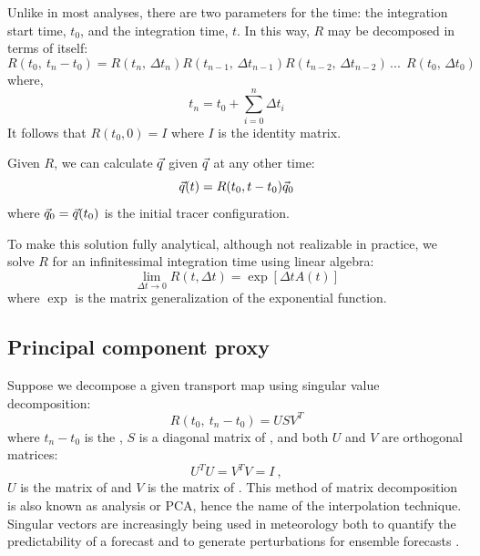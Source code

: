 Unlike in most analyses, there are two parameters for the time:
the integration start time, $t_0$, and the integration time, $t$.
In this way, $R$ may be decomposed in terms of itself:
\begin{equation}
	R(t_0,~t_n-t_0) = R(t_n, \, \Delta t_n) R(t_{n-1},\,\Delta t_{n-1}) R(t_{n-2},\,\Delta t_{n-2}) \, ...~~ 
	R(t_0,\,\Delta t_0)
\label{matrix_soln_decomposition}
\end{equation}
where,
\begin{equation}
t_n=t_0+\sum_{i=0}^{n} \Delta t_i
\end{equation}
It follows that $R(t_0, 0)=I$ where $I$ is the identity matrix.

Given $R$, 
we can calculate $\vec q$ given $\vec q$ at any other time:
\begin{equation}
	\vec q(t) = R(t_0, t-t_0) \vec q_0
	\label{tracer_integration}
\end{equation}
where $\vec q_0 = \vec q(t_0)$ is the initial tracer configuration.

To make this solution fully analytical, although not realizable in practice,
we solve $R$ for an infinitessimal integration time using linear algebra:
\begin{equation}
	\lim_{\Delta t \rightarrow 0} R(t, \Delta t) = \exp \left [ \Delta t A(t) \right ]
\end{equation}
where $\exp$ is the matrix generalization of the exponential function.

\subsection{Principal component proxy}

Suppose we decompose a given transport map using singular value decomposition:
\begin{equation}
	R(t_0, ~ t_n - t_0) = U S V^T
	\label{SVD}
\end{equation}
where 
$t_n - t_0$ is the ,
$S$ is a diagonal matrix of ,
and both $U$ and $V$ are orthogonal matrices:
\begin{equation}
	U^T U = V^T V = I~,
\end{equation}
$U$ is the matrix of  and 
$V$ is the matrix of  \citep{Press_etal1992}.
This method of matrix decomposition is also known as 
analysis or PCA, hence the name of the interpolation technique.
Singular vectors are increasingly being used in meteorology both to quantify the
predictability of a forecast and to generate perturbations for ensemble
forecasts \citep{Tang_etal2006}.


